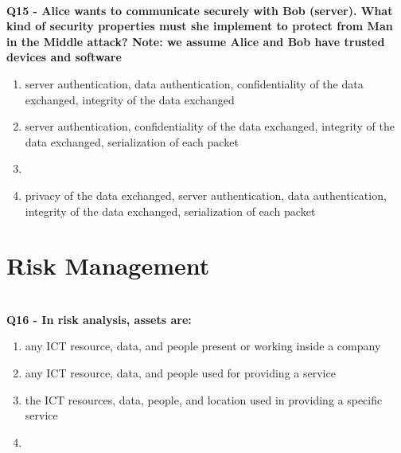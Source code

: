 \textbf{\\Q15 - Alice wants to communicate securely with Bob (server). What kind of security properties must she implement to protect from Man in the Middle attack? Note: we assume Alice and Bob have trusted devices and software}
\begin{enumerate}
	\item[A.] server authentication, data authentication, confidentiality of the data exchanged, integrity of the data exchanged
	\item[B.] server authentication, confidentiality of the data exchanged, integrity of the data exchanged, serialization of each packet
	\item[C.] 
	\item[D.] privacy of the data exchanged, server authentication, data authentication, integrity of the data exchanged, serialization of each packet
\end{enumerate}

\section{Risk Management}


\textbf{\\Q16 - In risk analysis, assets are:}
\begin{enumerate}
	\item[A.] any ICT resource, data, and people present or working inside a company
	\item[B.] any ICT resource, data, and people used for providing a service
	\item[C.] the ICT resources, data, people, and location used in providing a specific service
	\item[D.] 
\end{enumerate}

